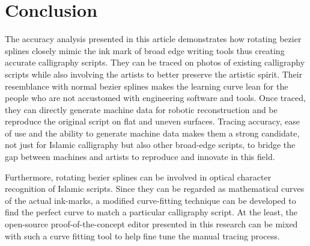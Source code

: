 \section{Conclusion}
\label{Chapter:Conclusion}
{
    \noindent The accuracy analysis presented in this article demonstrates how rotating bezier splines closely mimic the ink mark of broad edge writing tools thus creating accurate calligraphy scripts. They can be traced on photos of existing calligraphy scripts while also involving the artists to better preserve the artistic spirit. Their resemblance with normal bezier splines makes the learning curve lean for the people who are not accustomed with engineering software and tools. Once traced, they can directly generate machine data for robotic reconstruction and be reproduce the original script on flat and uneven surfaces. Tracing accuracy, ease of use and the ability to generate machine data makes them a strong candidate, not just for Islamic calligraphy but also other broad-edge scripts, to bridge the gap between machines and artists to reproduce and innovate in this field.

    Furthermore, rotating bezier splines can be involved in optical character recognition of Islamic scripts. Since they can be regarded as mathematical curves of the actual ink-marks, a modified curve-fitting technique can be developed to find the perfect curve to match a particular calligraphy script. At the least, the open-source proof-of-the-concept editor presented in this research can be mixed with such a curve fitting tool to help fine tune the manual tracing process.
} 